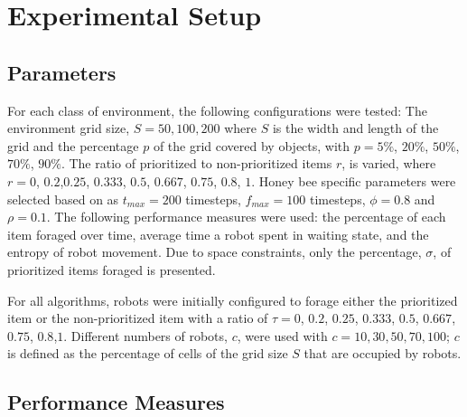 
\chapter{Experimental Setup}
\label{chap:third}




\section{Parameters}
\label{parameters}

	
For each class of environment, the following configurations were tested: The environment grid size, $S=50,100,200$ where $S$ is the width and length of the grid and the percentage $p$ of the grid covered by objects, with $p= 5\%$, $20\%$, $50\%$, $70\%$, $90\%$. The ratio of prioritized to non-prioritized items $r$, is varied, where $r=0$, $0.2$,$0.25$, $0.333$, $0.5$, $0.667$, $0.75$, $0.8$, $1$. Honey bee specific parameters were selected based on \cite{seeley2009wisdom} as 
$t_{max}=200$ timesteps, $f_{max}=100$ timesteps, $\phi=0.8$ and $\rho=0.1$.
The following performance measures were used: the percentage of each item foraged over time, average time a robot spent in waiting state, and the entropy of robot movement. Due to space constraints, only the percentage, $\sigma$, of prioritized items foraged is presented. 

For all algorithms, robots were initially configured to forage either the prioritized item or the non-prioritized item with a ratio of $\tau=0$, $0.2$, $0.25$, $0.333$, $0.5$, $0.667$, $0.75$, $0.8$,$1$. Different numbers of robots, $c$, were used with $c=10, 30, 50, 70, 100$; $c$ is defined as the percentage of cells of the grid size $S$ that are occupied by robots.

\section{Performance Measures}
\label{thri:third:performancemeasures}

